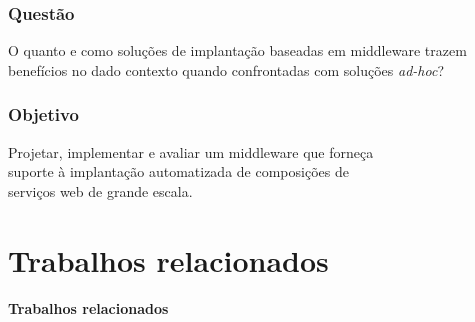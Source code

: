 \documentclass{beamer}
\newcommand\adhoc{\emph{ad-hoc}\xspace}
\newcommand\sectiontitle[1]{\begin{center}\huge\textbf{#1}\end{center}}
\newcommand\frase[1]{\begin{center}\large#1\end{center}}
\begin{document}
\begin{frame}
\frametitle{Questão}

\frase{O quanto e como soluções de implantação baseadas em middleware  
trazem benefícios no dado contexto
quando confrontadas com soluções \adhoc?}

\end{frame}


\begin{frame}
\frametitle{Objetivo}

\frase{Projetar, implementar e avaliar um middleware que forneça \\ suporte à implantação automatizada de  composições de \\ serviços web de grande escala.}

\end{frame}


\section{Trabalhos relacionados}

\begin{frame}

\sectiontitle{Trabalhos relacionados}

\end{frame}

\end{document}
